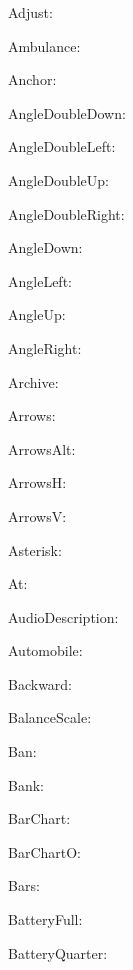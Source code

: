 \documentclass{article}
\begin{document}
      Adjust: \faAdjust\ 

      Ambulance: \faAmbulance\ 

      Anchor: \faAnchor\ 

      AngleDoubleDown: \faAngleDoubleDown\ 

      AngleDoubleLeft: \faAngleDoubleLeft\ 

      AngleDoubleUp: \faAngleDoubleUp\ 

      AngleDoubleRight: \faAngleDoubleRight\ 

      AngleDown: \faAngleDown\ 

      AngleLeft: \faAngleLeft\ 

      AngleUp: \faAngleUp\ 

      AngleRight: \faAngleRight\ 

      Archive: \faArchive\ 

      Arrows: \faArrows\ 

      ArrowsAlt: \faArrowsAlt\ 

      ArrowsH: \faArrowsH\ 

      ArrowsV: \faArrowsV\ 

      Asterisk: \faAsterisk\ 

      At: \faAt\ 

      AudioDescription: \faAudioDescription\ 

      Automobile: \faAutomobile\ 

      Backward: \faBackward\ 

      BalanceScale: \faBalanceScale\ 

      Ban: \faBan\ 

      Bank: \faBank\ 

      BarChart: \faBarChart\ 

      BarChartO: \faBarChartO\ 

      Bars: \faBars\ 

      BatteryFull: \faBatteryFull\ 

      BatteryQuarter: \faBatteryQuarter\ 
\end{document}
